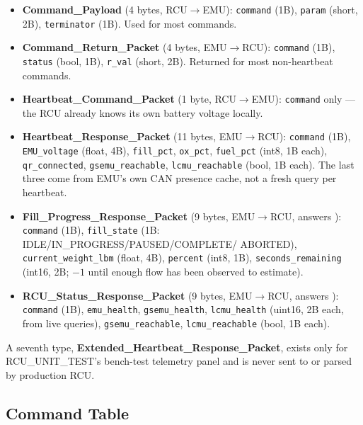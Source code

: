 \documentclass[11pt,letterpaper]{article}
\begin{document}
\begin{sloppypar}
\begin{itemize}[nosep]
  \item \textbf{Command\_Payload} (4 bytes, RCU$\to$EMU): \texttt{command}
        (1B), \texttt{param} (short, 2B), \texttt{terminator} (1B).  Used
        for most commands.
  \item \textbf{Command\_Return\_Packet} (4 bytes, EMU$\to$RCU):
        \texttt{command} (1B), \texttt{status} (bool, 1B), \texttt{r\_val}
        (short, 2B).  Returned for most non-heartbeat commands.
  \item \textbf{Heartbeat\_Command\_Packet} (1 byte, RCU$\to$EMU):
        \texttt{command} only --- the RCU already knows its own battery
        voltage locally.
  \item \textbf{Heartbeat\_Response\_Packet} (11 bytes, EMU$\to$RCU):
        \texttt{command} (1B), \texttt{EMU\_voltage} (float, 4B),
        \texttt{fill\_pct}, \texttt{ox\_pct}, \texttt{fuel\_pct} (int8,
        1B each), \texttt{qr\_connected}, \texttt{gsemu\_reachable},
        \texttt{lcmu\_reachable} (bool, 1B each). The last three come
        from EMU's own CAN presence cache, not a fresh query per
        heartbeat.
  \item \textbf{Fill\_Progress\_Response\_Packet} (9 bytes, EMU$\to$RCU,
        answers ): \texttt{command} (1B),
        \texttt{fill\_state} (1B: IDLE/IN\_PROGRESS/PAUSED/COMPLETE/
        ABORTED), \texttt{current\_weight\_lbm} (float, 4B),
        \texttt{percent} (int8, 1B), \texttt{seconds\_remaining} (int16,
        2B; $-1$ until enough flow has been observed to estimate).
  \item \textbf{RCU\_Status\_Response\_Packet} (9 bytes, EMU$\to$RCU,
        answers ): \texttt{command} (1B),
        \texttt{emu\_health}, \texttt{gsemu\_health}, \texttt{lcmu\_health}
        (uint16, 2B each, from live  queries),
        \texttt{gsemu\_reachable}, \texttt{lcmu\_reachable} (bool, 1B each).
\end{itemize}
\end{sloppypar}

\begin{sloppypar}
A seventh type, \textbf{Extended\_Heartbeat\_Response\_Packet}, exists
only for RCU\_UNIT\_TEST's bench-test telemetry panel and is never sent
to or parsed by production RCU.
\end{sloppypar}

\subsection{Command Table}
\end{document}
